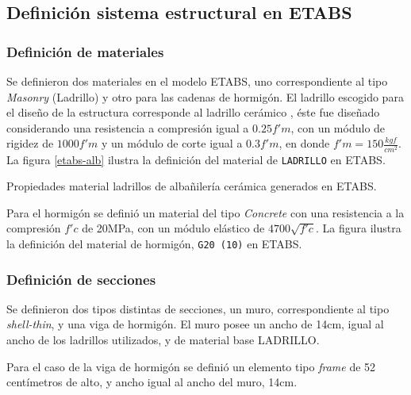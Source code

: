 \newpage
\subsection{Definición sistema estructural en ETABS}

    \subsubsection{Definición de materiales}
    
    Se definieron dos materiales en el modelo ETABS, uno correspondiente al tipo \textit{Masonry} (Ladrillo) y otro para las cadenas de hormigón. El ladrillo escogido para el diseño de la estructura corresponde al ladrillo cerámico , éste fue diseñado considerando una resistencia a compresión igual a $0.25f'm$, con un módulo de rigidez de $1000f'm$ y un módulo de corte igual a $0.3f'm$, en donde $f'm=150\frac{kgf}{cm^2}$. La figura \ref{etabs-alb} ilustra la definición del material de \texttt{LADRILLO} en ETABS.
    
    \begin{images}[\label{etabs-alb}]{Propiedades material ladrillos de albañilería cerámica generados en ETABS.}
    \end{images}
    
    Para el hormigón se definió un material del tipo \textit{Concrete} con una resistencia a la compresión $f'c$ de 20MPa, con un módulo elástico de $4700\sqrt{f'c}$. La figura ilustra la definición del material de hormigón, \texttt{G20 (10)} en ETABS.
    

\newpage    
\subsubsection{Definición de secciones}
    
    Se definieron dos tipos distintas de secciones, un muro, correspondiente al tipo \textit{shell-thin}, y una viga de hormigón. El muro posee un ancho de 14cm, igual al ancho de los ladrillos utilizados, y de material base LADRILLO.
    
    
    Para el caso de la viga de hormigón se definió un elemento tipo \textit{frame} de 52 centímetros de alto, y ancho igual al ancho del muro, 14cm.
    
